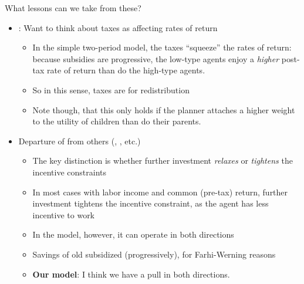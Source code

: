 \documentclass[11pt]{article}
\begin{document}
What lessons can we take from these? 
\begin{itemize}
    \item \cite{farhi2010progressive}: Want to think about taxes as affecting rates of return 
    \begin{itemize}
        \item In the simple two-period model, the taxes ``squeeze'' the rates of return: because subsidies are progressive, the low-type agents enjoy a \textit{higher} post-tax rate of return than do the high-type agents. 
        \item So in this sense, taxes are for redistribution 
        \item Note though, that this only holds if the planner attaches a higher weight to the utility of children than do their parents. 
    \end{itemize} 
    \item Departure of \cite{shourideh2014optimal} from others (\cite{golosov2003optimal}, \cite{albanesi2006dynamic}, etc.)
    \begin{itemize}
        \item The key distinction is whether further investment \textit{relaxes} or \textit{tightens} the incentive constraints 
        \item In most cases with labor income and common (pre-tax) return, further investment tightens the incentive constraint, as the agent has less incentive to work 
        \item In the \cite{shourideh2014optimal} model, however, it can operate in both directions 
        \item Savings of old subsidized (progressively), for Farhi-Werning reasons
        \item \textbf{Our model}: I think we have a pull in both directions. 
    \end{itemize}
\end{itemize}



\end{document}

